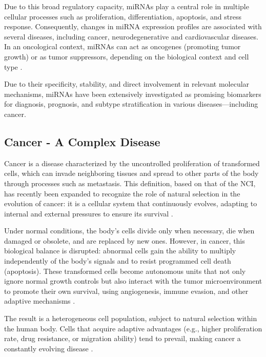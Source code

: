 Due to this broad regulatory capacity, miRNAs play a central role in multiple cellular processes such as proliferation, 
differentiation, apoptosis, and stress response. Consequently, changes in miRNA expression profiles are associated with 
several diseases, including cancer, neurodegenerative and cardiovascular diseases. In an oncological context, miRNAs can 
act as oncogenes (promoting tumor growth) or as tumor suppressors, depending on the biological context and cell type \textcite{regulatory_mecha_mirnaGulyaeva2016}.

Due to their specificity, stability, and direct involvement in relevant molecular mechanisms, miRNAs have been extensively 
investigated as promising biomarkers for diagnosis, prognosis, and subtype stratification in various diseases—including cancer.

\subsection*{Cancer - A Complex Disease}
Cancer is a disease characterized by the uncontrolled proliferation of transformed cells, which can invade neighboring 
tissues and spread to other parts of the body through processes such as metastasis. This definition, based on that of the 
NCI, has recently been expanded to recognize the role of natural selection in the evolution of cancer: it is a cellular 
system that continuously evolves, adapting to internal and external pressures to ensure its survival \textcite{def_of_cancer_Brown2023,NCI2021}.

Under normal conditions, the body's cells divide only when necessary, die when damaged or obsolete, and are replaced by 
new ones. However, in cancer, this biological balance is disrupted: abnormal cells gain the ability to multiply 
independently of the body's signals and to resist programmed cell death (apoptosis). These transformed cells become 
autonomous units that not only ignore normal growth controls but also interact with the tumor microenvironment to 
promote their own survival, using angiogenesis, immune evasion, and other adaptive mechanisms \textcite{def_of_cancer_Brown2023,NCI2021}.

The result is a heterogeneous cell population, subject to natural selection within the human body. Cells that acquire 
adaptive advantages (e.g., higher proliferation rate, drug resistance, or migration ability) tend to prevail, making 
cancer a constantly evolving disease \textcite{def_of_cancer_Brown2023}.

